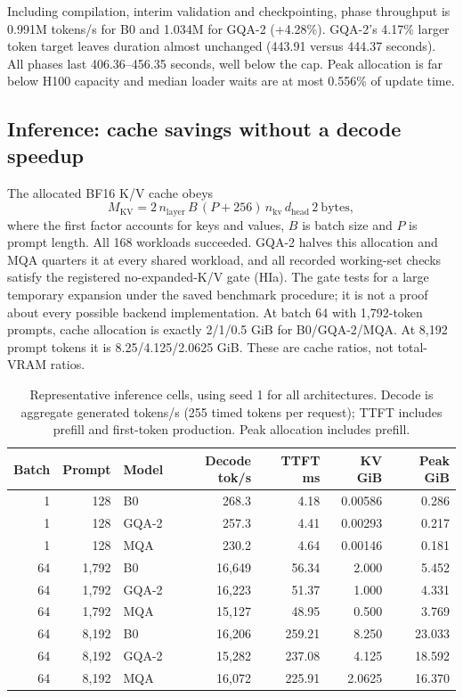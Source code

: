 \documentclass[10pt,twocolumn]{article}
\begin{document}
Including compilation, interim validation and checkpointing, phase throughput is 0.991M tokens/s for B0 and
1.034M for GQA-2 (+4.28\%). GQA-2's 4.17\% larger token target leaves duration almost unchanged
(443.91 versus 444.37 seconds). All phases last 406.36--456.35 seconds, well below the cap.
Peak allocation is far below H100 capacity and median loader waits are at most 0.556\% of update time.

\subsection{Inference: cache savings without a decode speedup}
The allocated BF16 K/V cache obeys
\[
M_{\mathrm{KV}}=2\,n_{\mathrm{layer}}\,B\,(P+256)\,n_{\mathrm{kv}}\,d_{\mathrm{head}}\,2\ \text{bytes},
\]
where the first factor accounts for keys and values, $B$ is batch size and $P$ is prompt length.
All 168 workloads succeeded. GQA-2 halves this allocation and MQA quarters it at every shared workload, and all recorded
working-set checks satisfy the registered no-expanded-K/V gate (HIa). The gate tests for a large temporary expansion
under the saved benchmark procedure; it is not a proof about every possible backend implementation.
At batch 64 with 1{,}792-token prompts, cache allocation is exactly 2/1/0.5 GiB for B0/GQA-2/MQA.
At 8{,}192 prompt tokens it is 8.25/4.125/2.0625 GiB. These are cache ratios, not total-VRAM ratios.

\begin{table}[t]
\centering\small
\caption{Representative inference cells, using seed 1 for all architectures. Decode is aggregate generated tokens/s
(255 timed tokens per request); TTFT includes prefill and first-token production. Peak allocation includes prefill.}
\label{tab:inference}
\footnotesize\setlength{\tabcolsep}{2.5pt}
\begin{tabular}{@{}rrlrrrr@{}}
\toprule
Batch & Prompt & Model & Decode tok/s & TTFT ms & KV GiB & Peak GiB\\
\midrule
1 & 128 & B0 & 268.3 & 4.18 & 0.00586 & 0.286\\
1 & 128 & GQA-2 & 257.3 & 4.41 & 0.00293 & 0.217\\
1 & 128 & MQA & 230.2 & 4.64 & 0.00146 & 0.181\\
64 & 1{,}792 & B0 & 16{,}649 & 56.34 & 2.000 & 5.452\\
64 & 1{,}792 & GQA-2 & 16{,}223 & 51.37 & 1.000 & 4.331\\
64 & 1{,}792 & MQA & 15{,}127 & 48.95 & 0.500 & 3.769\\
64 & 8{,}192 & B0 & 16{,}206 & 259.21 & 8.250 & 23.033\\
64 & 8{,}192 & GQA-2 & 15{,}282 & 237.08 & 4.125 & 18.592\\
64 & 8{,}192 & MQA & 16{,}072 & 225.91 & 2.0625 & 16.370\\
\bottomrule
\end{tabular}
\end{table}
\end{document}
